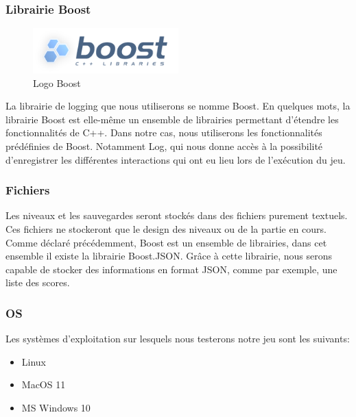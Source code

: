 \subsubsection{Librairie Boost}
\begin{figure}[h]
	\centering
	\includegraphics[width=0.5\textwidth]{pictures/Boost_logo.png}
	\caption{Logo Boost}
	\label{fig:logo_boost}
\end{figure}
La librairie de logging que nous utiliserons se nomme Boost. En quelques mots, la librairie Boost est elle-même un ensemble de librairies permettant d'étendre les fonctionnalités de C++. Dans notre cas, nous utiliserons les fonctionnalités prédéfinies de Boost. Notamment Log, qui nous donne accès à la possibilité d'enregistrer les différentes interactions qui ont eu lieu lors de l'exécution du jeu.

\subsubsection{Fichiers}
Les niveaux et les sauvegardes seront stockés dans des fichiers purement textuels. Ces fichiers ne stockeront que le design des niveaux ou de la partie en cours.
Comme déclaré précédemment, Boost est un ensemble de librairies, dans cet ensemble il existe la librairie Boost.JSON. Grâce à cette librairie, nous serons capable de stocker des informations en format JSON, comme par exemple, une liste des scores.

\subsubsection{OS}
Les systèmes d'exploitation sur lesquels nous testerons notre jeu sont les suivants:
\begin{itemize}
	\item Linux
	\item MacOS 11
	\item MS Windows 10
	\end{itemize}
